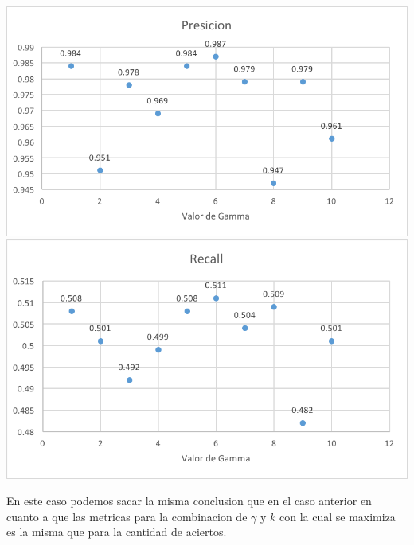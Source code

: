 \includegraphics[scale=1]{imagenes/plsdaPresicion.png}\\
\includegraphics[scale=1]{imagenes/plsdaRecall.png}

En este caso podemos sacar la misma conclusion que en el caso anterior en cuanto a que las metricas para la combinacion de $\gamma$ y $k$ con la cual se maximiza es la misma que para la cantidad de aciertos. 

